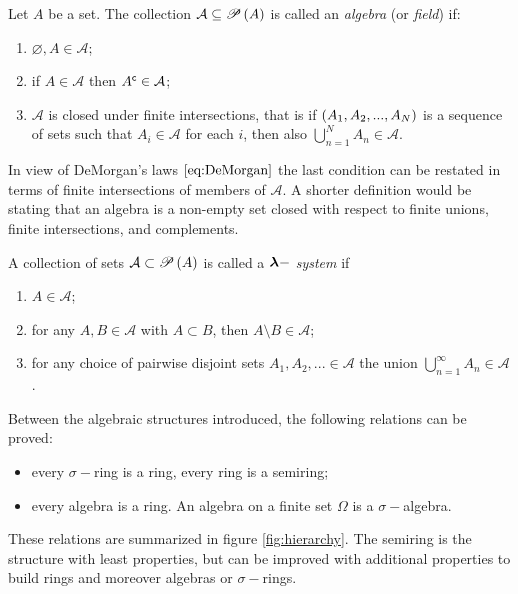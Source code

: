 \begin{definition}[Algebra]\label{def:Algebra}
    Let $A$ be a set. The collection $\mathcal{A}\subseteq\mathscr{P}\left( A \right)$ is called an \emph{algebra} (or \emph{field}) if:
    \begin{enumerate}[label=(\roman*)]
        \item $\varnothing,A\in\mathcal{A}$;
        \item if $A\in\mathcal{A}$ then ${A}^{\mathsf{c}}\in\mathcal{A}$;
        \item $\mathcal{A}$ is closed under finite intersections, that is
        if $\left( A_{1},A_{2},...,A_{N} \right)$ is a sequence of sets such that $A_{i}\in\mathcal{A}$ for each $i$, then also $\bigcup_{n=1}^{N}A_{n}\in\mathcal{A}$. 
    \end{enumerate}
    In view of DeMorgan's laws $\eqref{eq:DeMorgan}$ the last condition can be restated in terms of finite intersections of members of $\mathcal{A}$. A shorter definition would be stating that an algebra is a non-empty set closed with respect to finite unions, finite intersections, and complements.
\end{definition}

\begin{definition}\label{def:LambdaSystem}
    A collection of sets $\mathcal{A}\subset\mathscr{P}\left( A \right)$ is called a \emph{$\boldsymbol{\lambda}-$ system} if
    \begin{enumerate}[label=(\roman*)]
        \item $A\in\mathcal{A}$;
        \item for any $A,B\in\mathcal{A}$ with $A\subset B$, then $A\setminus B\in\mathcal{A}$;
        \item for any choice of pairwise disjoint sets $A_{1},A_{2},...\in\mathcal{A}$ the union $\bigcup_{n=1}^{\infty}A_{n}\in\mathcal{A}$.
    \end{enumerate}
\end{definition}

\begin{theorem}
    Between the algebraic structures introduced, the following relations can be proved:
    \begin{itemize}
        \item every $\sigma-$ring is a ring, every ring is a semiring;
        \item every algebra is a ring. An algebra on a finite set $\Omega$ is a $\sigma-$algebra.
    \end{itemize}
    These relations are summarized in figure \ref{fig:hierarchy}. The semiring is the structure with least properties, but can be improved with additional properties to build rings and moreover algebras or $\sigma-$rings. 
\end{theorem}

